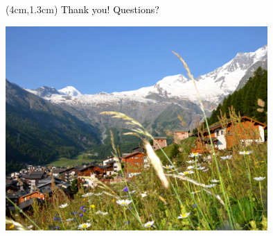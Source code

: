 \documentclass[16pt]{beamer}
\begin{document}
\begin{frame}
  \begin{textblock*}{5cm}(4cm,1.3cm)
  \Large \textcolor{black}{Thank you! Questions?}
  \end{textblock*}
  \begin{center}
    \includegraphics[width=10cm]{SaasFeeSummer.jpg}
  \end{center}
\end{frame}
\usebackgroundtemplate{}
\end{document}
